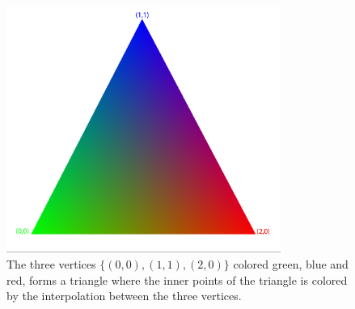 \begin{figure}[h]
\begin{center}
\includegraphics[width=0.8\textwidth, trim=0cm 0cm 0cm 0cm, clip]{opengl/figures/color_interpolation.png}
\end{center}
\caption{The three vertices $\{(0,0), (1,1), (2,0)\}$ colored green, blue and red, forms a triangle where the inner points of the triangle is colored by the interpolation between the three vertices.}
\label{fig:opengl_color_interpolation}
\end{figure}
